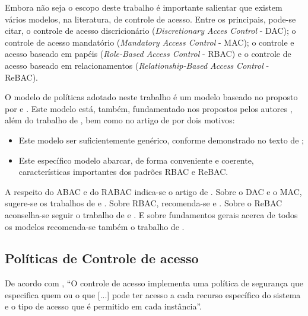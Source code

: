Embora não seja o escopo deste trabalho é importante salientar que existem vários modelos, na literatura, de controle de acesso. Entre os principais, pode-se citar, o controle de acesso discricionário (\textit{Discretionary Acces Control} - DAC); o controle de acesso mandatório (\textit{Mandatory Access Control} - MAC); o controle e acesso baseado em papéis (\textit{Role-Based Access Control} - RBAC) e o controle de acesso baseado em relacionamentos (\textit{Relationship-Based Access Control} - ReBAC). %

O modelo de políticas adotado neste trabalho é um modelo baseado no proposto por  e \cite{sarkis:artigo:2016}. Este modelo está, também, fundamentado nos propostos pelos autores , além do trabalho de , bem como no artigo de  por dois motivos:
\begin{itemize}
	\item Este modelo ser suficientemente genérico, conforme demonstrado no texto de ;
	\item Este específico modelo abarcar, de forma conveniente e coerente, características importantes dos padrões RBAC e ReBAC.
\end{itemize}

A respeito do ABAC e do RABAC indica-se o artigo de . Sobre o DAC e o MAC, sugere-se os trabalhos de  e . Sobre RBAC, recomenda-se  e . Sobre o ReBAC aconselha-se seguir o trabalho de  e . E sobre fundamentos gerais acerca de todos os modelos recomenda-se também o trabalho de .

\subsection{Políticas de Controle de acesso}\label{controle_acesso}
De acordo com , ``O controle de acesso implementa uma política de segurança que especifica quem ou o que [...] pode ter acesso a cada recurso específico do sistema e o tipo de acesso que é permitido em cada instância''.

